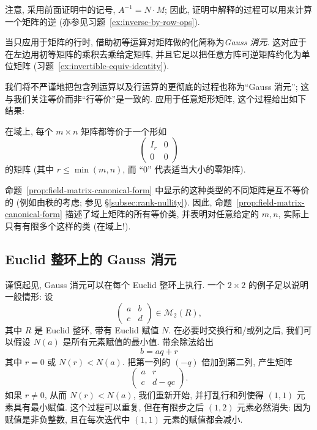 注意, 采用前面证明中的记号, $A^{-1}=N\cdot M$; 因此, 证明中解释的过程可以用来计算一个矩阵的逆 (亦参见习题~\ref{ex:inverse-by-row-ops}).

当只应用于矩阵的行时, 借助初等运算对矩阵做的化简称为\emph{Gauss 消元}. 这对应于在左边用初等矩阵的乘积去乘给定矩阵, 并且它足以把任意方阵可逆矩阵约化为单位矩阵 (习题~\ref{ex:invertible-equiv-identity}).

我们将不严谨地把包含列运算以及行运算的更彻底的过程也称为``Gauss 消元''; 这与我们关注等价而非``行等价''是一致的. 应用于任意矩形矩阵, 这个过程给出如下结果:

\begin{proposition}\label{prop:field-matrix-canonical-form}
在域上, 每个 $m\times n$ 矩阵都等价于一个形如
\[
\begin{pmatrix} I_r & 0\\ \hline 0 & 0\end{pmatrix}
\]
的矩阵 (其中 $r\le\min(m,n)$, 而 ``0'' 代表适当大小的零矩阵).
\end{proposition}

命题~\ref{prop:field-matrix-canonical-form} 中显示的这种类型的不同矩阵是互不等价的 (例如由秩的考虑; 参见 §\ref{subsec:rank-nullity}). 因此, 命题~\ref{prop:field-matrix-canonical-form} 描述了域上矩阵的所有等价类, 并表明对任意给定的 $m,n$, 实际上只有有限多个这样的类 (在域上!).

\subsection{Euclid 整环上的 Gauss 消元}
\label{subsec:gaussian-euclidean}

谨慎起见, Gauss 消元可以在每个 Euclid 整环上执行. 一个 $2\times2$ 的例子足以说明一般情形: 设
\[
\begin{pmatrix} a & b\\ c & d\end{pmatrix}\in\mathcal{M}_2(R),
\]
其中 $R$ 是 Euclid 整环, 带有 Euclid 赋值 $N$. 在必要时交换行和/或列之后, 我们可以假设 $N(a)$ 是所有元素赋值的最小值. 带余除法给出
\[
b = aq + r
\]
其中 $r=0$ 或 $N(r)<N(a)$. 把第一列的 $(-q)$ 倍加到第二列, 产生矩阵
\[
\begin{pmatrix} a & r\\ c & d-qc\end{pmatrix}.
\]
如果 $r\neq0$, 从而 $N(r)<N(a)$, 我们重新开始, 并打乱行和列使得 $(1,1)$ 元素具有最小赋值. 这个过程可以重复, 但在有限步之后 $(1,2)$ 元素必然消失: 因为赋值是非负整数, 且在每次迭代中 $(1,1)$ 元素的赋值都会减小.

